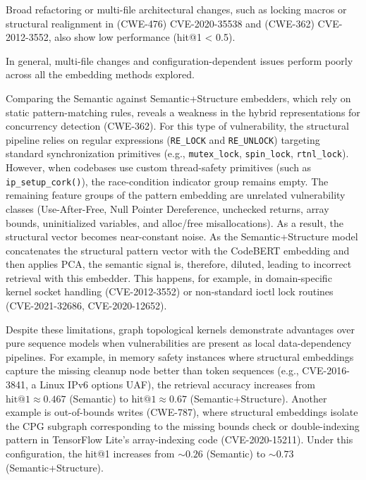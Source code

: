 Broad refactoring or multi-file architectural changes, such as locking macros or structural realignment in (CWE-476) CVE-2020-35538 and (CWE-362) CVE-2012-3552, also show low performance (hit@1 < 0.5).

In general, multi-file changes and configuration-dependent issues perform poorly across all the embedding methods explored. 

Comparing the Semantic against Semantic+Structure embedders, which rely on static pattern-matching rules, reveals a weakness in the hybrid representations for concurrency detection (CWE-362). 
For this type of vulnerability, the structural pipeline relies on regular expressions (\texttt{RE\_LOCK} and \texttt{RE\_UNLOCK}) targeting standard synchronization primitives (e.g., \texttt{mutex\_lock}, \texttt{spin\_lock}, \texttt{rtnl\_lock}). 
However, when codebases use custom thread-safety primitives (such as \texttt{ip\_setup\_cork()}), the race-condition indicator group remains empty.
The remaining feature groups of the pattern embedding are unrelated vulnerability classes (Use-After-Free, Null Pointer Dereference, unchecked returns, array bounds, uninitialized variables, and alloc/free misallocations). 
As a result, the structural vector becomes near-constant noise. 
As the Semantic+Structure model concatenates the structural pattern vector with the CodeBERT embedding and then applies PCA, the semantic signal is, therefore, diluted, leading to incorrect retrieval with this embedder.  
This happens, for example, in domain-specific kernel socket handling (CVE-2012-3552) or non-standard ioctl lock routines (CVE-2021-32686, CVE-2020-12652).


Despite these limitations, graph topological kernels demonstrate advantages over pure sequence models when vulnerabilities are present as local data-dependency pipelines. 
For example, in memory safety instances where structural embeddings capture the missing cleanup node better than token sequences (e.g., CVE-2016-3841, a Linux IPv6 options UAF), the retrieval accuracy increases from $\text{hit@1} \approx 0.467$ (Semantic) to $\text{hit@1} \approx 0.67$ (Semantic+Structure).
Another example is out-of-bounds writes (CWE-787), where structural embeddings isolate the CPG subgraph corresponding to the missing bounds check or double-indexing pattern in TensorFlow Lite's array-indexing code (CVE-2020-15211). 
Under this configuration, the hit@1 increases from $\sim0.26$ (Semantic) to $\sim0.73$ (Semantic+Structure).

